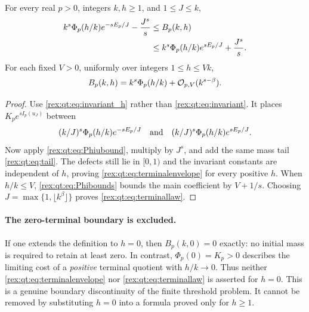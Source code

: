\begin{theorem}\label{rex:qt:thm:terminal}
For every real $p>0$, integers $k,h\ge1$, and $1\le J\le k$,
\begin{align}
 k^s\Phi_p(h/k)e^{-sE_p/J}-\frac{J^s}{s}
 &\le B_p(k,h)\notag\\
 &\le k^s\Phi_p(h/k)e^{sE_p/J}+\frac{J^s}{s}.
 \label{rex:qt:eq:terminalenvelope}
\end{align}
For each fixed $V>0$, uniformly over integers $1\le h\le Vk$,
\begin{equation}\label{rex:qt:eq:terminallaw}
 B_p(k,h)=k^s\Phi_p(h/k)+\mathcal O_{p,V}(k^{s-\beta}).
\end{equation}
\end{theorem}
\begin{proof}
Use \eqref{rex:qt:eq:invariant_h} rather than \eqref{rex:qt:eq:invariant}. It places $K_p e^{sI_p(u_J)}$ between
\[
 (k/J)^s\Phi_p(h/k)e^{-sE_p/J}
 \quad\hbox{and}\quad
 (k/J)^s\Phi_p(h/k)e^{sE_p/J}.
\]
Now apply \eqref{rex:qt:eq:Phiubound}, multiply by $J^s$, and add the same mass tail \eqref{rex:qt:eq:tail}. The defects still lie in $[0,1)$ and the invariant constants are independent of $h$, proving \eqref{rex:qt:eq:terminalenvelope} for every positive $h$. When $h/k\le V$, \eqref{rex:qt:eq:Phibounds} bounds the main coefficient by $V+1/s$. Choosing $J=\max\{1,\lfloor k^\beta\rfloor\}$ proves \eqref{rex:qt:eq:terminallaw}.
\end{proof}

\paragraph{The zero-terminal boundary is excluded.}
If one extends the definition to $h=0$, then $B_p(k,0)=0$ exactly: no initial mass is required to retain at least zero. In contrast, $\Phi_p(0)=K_p>0$ describes the limiting cost of a \emph{positive} terminal quotient with $h/k\to0$. Thus neither \eqref{rex:qt:eq:terminalenvelope} nor \eqref{rex:qt:eq:terminallaw} is asserted for $h=0$. This is a genuine boundary discontinuity of the finite threshold problem. It cannot be removed by substituting $h=0$ into a formula proved only for $h\ge1$.


